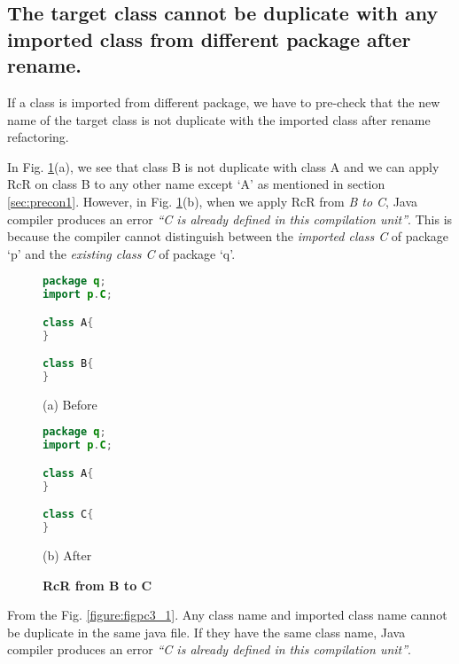 \subsection{The target class cannot be duplicate with any imported class from different package after rename.}

If a class is imported from different package, we have to pre-check that the new name of the target class is not duplicate with the imported class after rename refactoring. 

In Fig. \ref{figure:fig2}(a), we see that class B is not duplicate with class A and we can apply RcR on class B to any other name except `A' as mentioned in section \ref{sec:precon1}. However, in Fig. \ref{figure:fig2}(b), when we apply RcR from \emph{B to C}, Java compiler produces an error \textit{``C is already defined in this compilation unit''}. This is because the compiler cannot distinguish between the \emph{imported class C} of package `p' and the \emph{existing class C} of package `q'. 

\begin{figure}[th]
\centering
\begin{minipage}[t]{0.4\linewidth}
\begin{lstlisting}[language=java, basicstyle=\scriptsize\ttfamily,frame=single]
package q;
import p.C;

class A{
}

class B{
} 
\end{lstlisting}
\centering(a) Before
\end{minipage}
\hfill
\begin{minipage}[t]{0.4\linewidth}
\begin{lstlisting}[language=java, basicstyle=\scriptsize\ttfamily,frame=single]
package q;
import p.C;

class A{
}

class C{
} 
\end{lstlisting}
\centering(b) After
\end{minipage}
\caption{\textbf{RcR from B to C}}
\label{figure:fig2}
\end{figure}


From the Fig. \ref{figure:figpc3_1}. Any class name and imported class name cannot be duplicate in the same java file. If they have the same class name, Java compiler produces an error \textit{``C is already defined in this compilation unit''}.  

